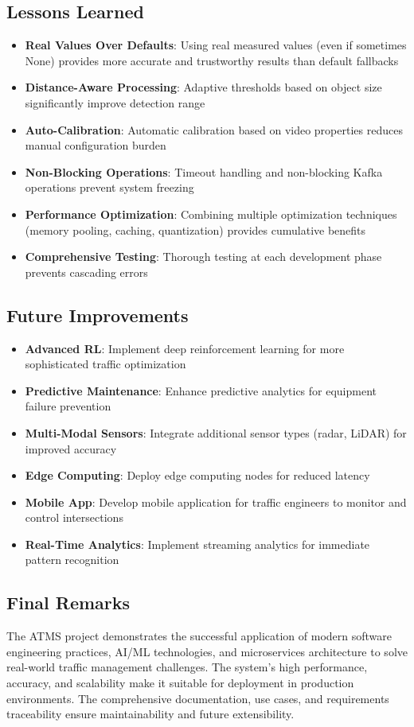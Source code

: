 \documentclass[12pt,a4paper]{article}
\begin{document}
\subsection{Lessons Learned}
\begin{itemize}
    \item \textbf{Real Values Over Defaults}: Using real measured values (even if sometimes None) provides more accurate and trustworthy results than default fallbacks
    \item \textbf{Distance-Aware Processing}: Adaptive thresholds based on object size significantly improve detection range
    \item \textbf{Auto-Calibration}: Automatic calibration based on video properties reduces manual configuration burden
    \item \textbf{Non-Blocking Operations}: Timeout handling and non-blocking Kafka operations prevent system freezing
    \item \textbf{Performance Optimization}: Combining multiple optimization techniques (memory pooling, caching, quantization) provides cumulative benefits
    \item \textbf{Comprehensive Testing}: Thorough testing at each development phase prevents cascading errors
\end{itemize}

\subsection{Future Improvements}
\begin{itemize}
    \item \textbf{Advanced RL}: Implement deep reinforcement learning for more sophisticated traffic optimization
    \item \textbf{Predictive Maintenance}: Enhance predictive analytics for equipment failure prevention
    \item \textbf{Multi-Modal Sensors}: Integrate additional sensor types (radar, LiDAR) for improved accuracy
    \item \textbf{Edge Computing}: Deploy edge computing nodes for reduced latency
    \item \textbf{Mobile App}: Develop mobile application for traffic engineers to monitor and control intersections
    \item \textbf{Real-Time Analytics}: Implement streaming analytics for immediate pattern recognition
\end{itemize}

\subsection{Final Remarks}
The ATMS project demonstrates the successful application of modern software engineering practices, AI/ML technologies, and microservices architecture to solve real-world traffic management challenges. The system's high performance, accuracy, and scalability make it suitable for deployment in production environments. The comprehensive documentation, use cases, and requirements traceability ensure maintainability and future extensibility.
\end{document}
